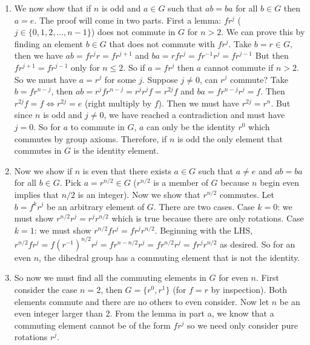 \documentclass[11pt]{article}
\begin{document}
\begin{exercise}{47}{24}
{\begin{enumerate}[label=(\alph*)]
            \item We now show that if $n$ is odd and $a \in G$ such that $ab = ba$ for all $b \in G$ then $a = e$.
            The proof will come in two parts.
            First a lemma: $fr^j$ ($j \in \{0, 1, 2, ..., n-1 \}$) does not commute in $G$ for $n > 2$.
            We can prove this by finding an element $b \in G$ that does not commute with $fr^j$.
            Take $b = r \in G$, then we have $ab = fr^j r = fr^{j+1}$ and $ba = rfr^j = fr^{-1}r^j = fr^{j-1}$
            But then $ fr^{j+1} = fr^{j-1} $ only for $n \leq 2$.
            So if $a = fr^j$ then $a$ cannot commute if $n > 2$. \parspace
            So we must have $a = r^j$ for some $j$.
            Suppose $j \neq 0$, can $r^j$ commute?
            Take $b = f r^{n-j}$, then $ab = r^j f r^{n-j} = r^j r^j f = r^{2j} f$ and $ba = f r^{n-j} r^j = f$.
            Then $r^{2j} f = f \iff r^{2j} = e$ (right multiply by $f$).
            Then we must have $r^{2j} = r^n$.
            But since $n$ is odd and $j \neq 0$, we have reached a contradiction and must have $j = 0$.
            So for $a$ to commute in $G$, $a$ can only be the identity $r^0$ which commutes by group axioms.
            Therefore, if $n$ is odd the only element that commutes in $G$ is the identity element.
            \item Now we show if $n$ is even that there exists $a \in G$ such that $a \ne e$ and $ab = ba$ for all $b \in G$.
            Pick $a = r^{n/2} \in G$ ($r^{n/2}$ is a member of $G$ because $n$ begin even implies that $n/2$ is an integer).
            Now we show that $r^{n/2}$ commutes.
            Let $b = f^k r^j$ be an arbitrary element of $G$.
            There are two cases.
            Case $k = 0$: we must show $r^{n/2} r^j = r^j r^{n/2} $ which is true because there are only rotations.
            Case $k = 1$: we must show $r^{n/2} f r^j = fr^j r^{n/2}$.
            Beginning with the LHS, $r^{n/2} f r^j = f (r^{-1})^{n/2} r^j = f r^{n- n/2} r^j = fr^{n/2}r^j = f r^j r^{n/2}$ as desired.
            So for an even $n$, the dihedral group has a commuting element that is not the identity.
            \item So now we must find all the commuting elements in $G$ for even $n$.
            First consider the case $n = 2$, then $G = \{ r^0, r^1 \}$ (for $f = r$ by inspection).
            Both elements commute and there are no others to even consider.
            Now let $n$ be an even integer larger than 2.
            From the lemma in part a, we know that a commuting element cannot be of the form $fr^j$ so we need only consider pure rotations $r^j$. \parspace

\end{enumerate}}
\end{exercise}
\end{document}
